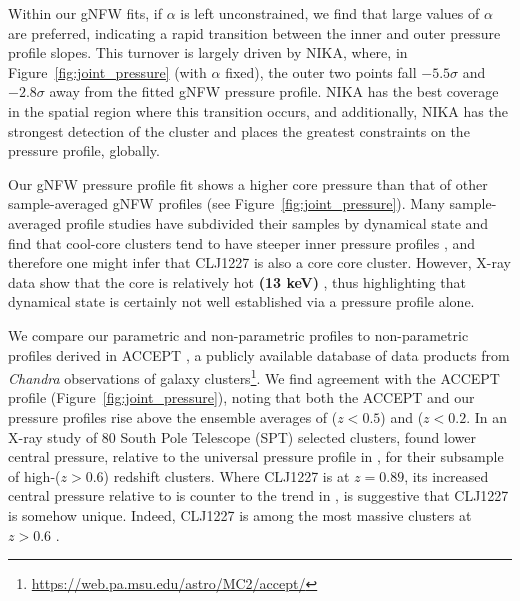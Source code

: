 \documentclass[onecolumn,traditabstract]{aa}
\begin{document}
Within our gNFW fits, if $\alpha$ is left unconstrained, we find that large values of $\alpha$ are preferred, indicating a
rapid transition between the inner and outer pressure profile slopes. This turnover is largely driven by NIKA, where, in
Figure~\ref{fig:joint_pressure} (with $\alpha$ fixed), the outer two points fall $-5.5\sigma$ and $-2.8\sigma$ away from
the fitted gNFW pressure profile. NIKA has the best coverage in the spatial region where this transition occurs, and additionally,
NIKA has the strongest detection of the cluster and places the greatest constraints on the pressure profile, globally.



Our gNFW pressure profile fit shows a higher core pressure than that of other sample-averaged gNFW profiles
(see Figure~\ref{fig:joint_pressure}). Many sample-averaged profile studies have subdivided their
  samples by dynamical state and find that cool-core clusters tend to have steeper inner pressure profiles
  \citep[e.g.,][]{arnaud2010,planck2013a,sayers2013,romero2017}, and therefore
one might infer that CLJ1227 is also a core core cluster. However, X-ray data show that the core is relatively hot \textbf{(13 keV)}
\citep{maughan2007}, thus highlighting that dynamical state is certainly not well established via a pressure profile alone.

We compare our parametric and non-parametric profiles to non-parametric profiles derived in ACCEPT \citep{cavagnolo2009}, a publicly available database of data products from \emph{Chandra} observations of galaxy clusters\footnote{\url{https://web.pa.msu.edu/astro/MC2/accept/}}. We find agreement with the ACCEPT profile (Figure~\ref{fig:joint_pressure}), noting that both the ACCEPT and our pressure profiles rise above the ensemble averages of \citet{planck2013a} ($z < 0.5$) and  ($z < 0.2$. In an X-ray study of 80 South Pole Telescope (SPT) selected clusters, \citet{mcdonald2014} found lower central pressure, relative to the universal pressure profile in , for their subsample of high-($z > 0.6$) redshift clusters. Where CLJ1227 is at $z=0.89$, its increased central pressure relative to  is counter to the trend in \citet{mcdonald2014}, is suggestive that CLJ1227 is somehow unique. Indeed, CLJ1227 is among the most massive clusters at $z > 0.6$ \citep[e.g.,][]{menanteau2012}.
\end{document}

